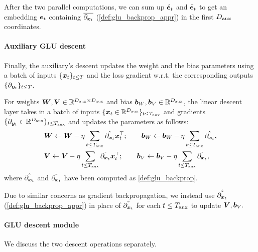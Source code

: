 After the two parallel computations, we can sum up $\Hat{\ve}_t$ and $\Tilde{\ve}_t$ to get an embedding $\ve_t$ containing $\overline{\partial_{{\bm{x}}_t}}$ (\cref{def:glu_backprop_appr}) in the first $D_{\text{aux}}$ coordinates.




\paragraph{Auxiliary GLU descent} Finally, the auxiliary's descent  updates the weight and the bias parameters using a batch of inputs $\{{\bm{x}}_t\}_{t \le T}$ and the loss gradient w.r.t. the corresponding outputs $\{ \partial_{{\bm{y}}_t} \}_{t \le T}$.

\begin{definition}\label{def:glu_descent}
    For weights ${\bm{W}}, {\bm{V}} \in\mathbb{R}^{D_{\text{aux}} \times D_{\text{aux}}}$ and bias ${\bm{b}}_W, {\bm{b}}_V \in \mathbb{R}^{ D_{\text{aux}} }$, the linear descent layer takes in a batch of inputs $\{ {\bm{x}}_t \in \mathbb{R}^{D_{\text{aux}}} \}_{t \le T_{\text{aux}}}$ and gradients $\{ \partial_{ {\bm{y}}_t } \in \mathbb{R}^{D_{\text{aux}}} \}_{t \le T_{\text{aux}}}$ and updates the parameters as follows:
    \begin{align*}
        &{\bm{W}} \gets {\bm{W}} - \eta \sum_{t \le T_{\text{aux}}} \Hat{\partial_{{\bm{x}}_t}} {\bm{x}}_t^{\top}; \quad \quad
        {\bm{b}}_W \gets {\bm{b}}_W - \eta \sum_{t \le T_{\text{aux}}} \Hat{\partial_{{\bm{x}}_t}} ,\\ &
        {\bm{V}} \gets {\bm{V}} - \eta \sum_{t \le T_{\text{aux}}}  \Tilde{ \partial_{{\bm{x}}_t} } {\bm{x}}_t^{\top}; \quad \quad
        {\bm{b}}_V \gets {\bm{b}}_V - \eta \sum_{t \le T_{\text{aux}}} \Tilde{ \partial_{{\bm{x}}_t} },
    \end{align*}
    where $\Hat{\partial_{{\bm{x}}_t}}$ and $\Tilde{ \partial_{{\bm{x}}_t} }$ have been computed as \cref{def:glu_backprop}.
\end{definition}
Due to similar concerns as gradient backpropagation, we instead use $\Hat{\Tilde{ \partial_{{\bm{x}}_t} }}$ (\cref{def:glu_backprop_appr}) in place of $\Tilde{ \partial_{{\bm{x}}_t} }$ for each $t \le T_{\text{aux}}$ to update ${\bm{V}}, {\bm{b}}_V.$


 
\paragraph{\simulator{} GLU descent module} 
We discuss the two descent operations separately.

